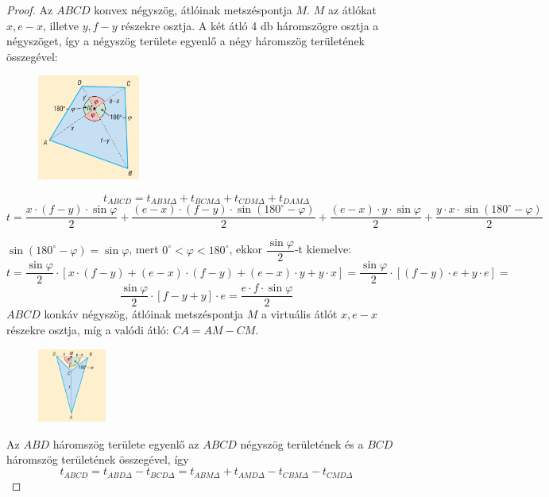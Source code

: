 \documentclass[12pt,a4paper]{article}
\begin{document}
\begin{proof}
Az $ABCD$ konvex négyszög, átlóinak metszéspontja $M$. $M$ az átlókat $x, e - x$, illetve $y, f - y$ részekre osztja. A két átló 4 db háromszögre osztja a négyszöget, így a négyszög területe egyenlő a négy háromszög területének összegével:
\begin{figure}[h]
\centering
\includegraphics[width=0.3\textwidth]{negyszog_terulete_biz}
\end{figure}

$$t_{ABCD}=t_{ABM\Delta}+t_{BCM\Delta}+t_{CDM\Delta}+t_{DAM\Delta}$$
$$t=\dfrac{x \cdot (f-y) \cdot \sin \varphi}{2}+\dfrac{(e-x) \cdot (f-y) \cdot \sin (180^\circ-\varphi)}{2}+\dfrac{(e-x) \cdot y \cdot \sin \varphi}{2}+\dfrac{y \cdot x \cdot \sin (180^\circ-\varphi)}{2}$$

$\sin(180^\circ-\varphi)=\sin \varphi$, mert $0^\circ<\varphi<180^\circ$, ekkor $\dfrac{\sin \varphi}{2}$-t kiemelve:
$$t=\dfrac{\sin \varphi}{2}\cdot [x \cdot (f-y) + (e-x) \cdot (f-y) + (e-x) \cdot y + y \cdot x]=\dfrac{\sin \varphi}{2}\cdot [(f-y)\cdot e+y\cdot e]=$$
$$\dfrac{\sin \varphi}{2} \cdot [f-y+y]\cdot e=\dfrac{e\cdot f\cdot \sin \varphi}{2}$$
\newpage
$ABCD$ konkáv négyszög, átlóinak metszéspontja $M$ a virtuális átlót $x, e - x$ részekre osztja, míg a valódi átló: $CA = AM - CM$.
\begin{figure}[h]
\centering
\includegraphics[width=0.2\textwidth]{konkav_negyszog_terulet}
\end{figure}

Az $ABD$ háromszög területe egyenlő az $ABCD$ négyszög területének és a $BCD$ háromszög területének összegével, így
$$t_{ABCD}=t_{ABD\Delta}-t_{BCD\Delta}=t_{ABM\Delta}+t_{AMD\Delta}-t_{CBM\Delta}-t_{CMD\Delta}$$
\end{proof}
\end{document}
